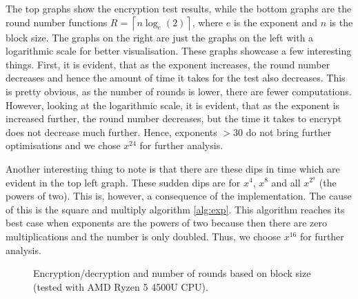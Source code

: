 \documentclass{Resources/UoBLab1}
\theoremstyle{definition}
\begin{document}
The top graphs show the encryption test results, while the bottom graphs are the round number functions $R = \left\lceil n\log_e(2) \right\rceil$, where $e$ is the exponent and $n$ is the block size. The graphs on the right are just the graphs on the left with a logarithmic scale for better visualisation. These graphs showcase a few interesting things. First, it is evident, that as the exponent increases, the round number decreases and hence the amount of time it takes for the test also decreases. This is pretty obvious, as the number of rounds is lower, there are fewer computations. However, looking at the logarithmic scale, it is evident, that as the exponent is increased further, the round number decreases, but the time it takes to encrypt does not decrease much further. Hence, exponents $> 30$ do not bring further optimisations and we chose $x^{24}$ for further analysis.

Another interesting thing to note is that there are these dips in time which are evident in the top left graph. These sudden dips are for $x^4$, $x^8$ and all $x^{2^a}$ (the powers of two). This is, however, a consequence of the implementation. The cause of this is the square and multiply algorithm \ref{alg:exp}. This algorithm reaches its best case when exponents are the powers of two because then there are zero multiplications and the number is only doubled. Thus, we choose $x^{16}$ for further analysis.

\begin{figure}
    \caption{Encryption/decryption and number of rounds based on block size (tested with AMD Ryzen 5 4500U CPU).}\label{fig:enc-block}
    \hspace{-1cm}
    \centering
    \begin{minipage}{0.5\textwidth}
        \centering
        
    \end{minipage}\hfill
    \begin{minipage}{0.5\textwidth}
        \centering
        
    \end{minipage}
    
    \vspace{-1cm}
\end{figure}
\end{document}
